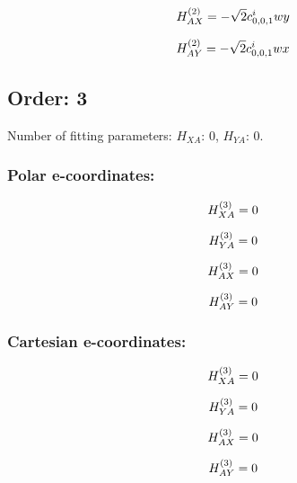 \documentclass[fleqn]{article}
\begin{document}
\begin{dmath*}
H_{AX}^{(2)}=- \sqrt{2} c^{i}_{0,0,1} w y\\
\end{dmath*}

\begin{dmath*}
H_{AY}^{(2)}=-  \sqrt{2} c^{i}_{0,0,1} w x\\
\end{dmath*}
\subsection{Order: 3}
Number of fitting parameters: $H_{XA}$: $0$, $H_{YA}$: $0$.
\subsubsection*{Polar e-coordinates:}

\begin{dmath*}
H_{XA}^{(3)}=0\\
\end{dmath*}

\begin{dmath*}
H_{YA}^{(3)}=0\\
\end{dmath*}

\begin{dmath*}
H_{AX}^{(3)}=0\\
\end{dmath*}

\begin{dmath*}
H_{AY}^{(3)}=0\\
\end{dmath*}
\subsubsection*{Cartesian e-coordinates:}

\begin{dmath*}
H_{XA}^{(3)}=0\\
\end{dmath*}

\begin{dmath*}
H_{YA}^{(3)}=0\\
\end{dmath*}

\begin{dmath*}
H_{AX}^{(3)}=0\\
\end{dmath*}

\begin{dmath*}
H_{AY}^{(3)}=0\\
\end{dmath*}
\end{document}
